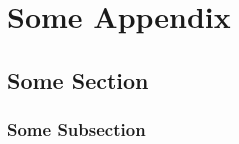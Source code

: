 \chapter{Some Appendix}
\blindtext

\section{Some Section}
\blindtext

\subsection{Some Subsection}
\blindtext
